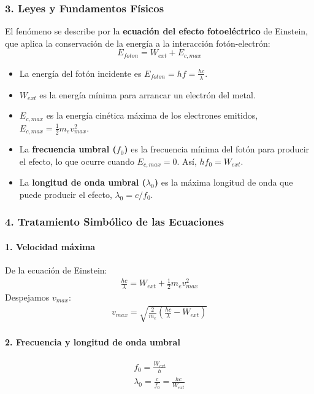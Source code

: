 \subsubsection*{3. Leyes y Fundamentos Físicos}
El fenómeno se describe por la \textbf{ecuación del efecto fotoeléctrico} de Einstein, que aplica la conservación de la energía a la interacción fotón-electrón:
$$ E_{foton} = W_{ext} + E_{c,max} $$
\begin{itemize}
    \item La energía del fotón incidente es $E_{foton} = hf = \frac{hc}{\lambda}$.
    \item $W_{ext}$ es la energía mínima para arrancar un electrón del metal.
    \item $E_{c,max}$ es la energía cinética máxima de los electrones emitidos, $E_{c,max} = \frac{1}{2}m_e v_{max}^2$.
    \item La \textbf{frecuencia umbral ($f_0$)} es la frecuencia mínima del fotón para producir el efecto, lo que ocurre cuando $E_{c,max}=0$. Así, $hf_0 = W_{ext}$.
    \item La \textbf{longitud de onda umbral ($\lambda_0$)} es la máxima longitud de onda que puede producir el efecto, $\lambda_0 = c/f_0$.
\end{itemize}

\subsubsection*{4. Tratamiento Simbólico de las Ecuaciones}
\paragraph*{1. Velocidad máxima}
De la ecuación de Einstein:
\begin{gather}
    \frac{hc}{\lambda} = W_{ext} + \frac{1}{2}m_e v_{max}^2
\end{gather}
Despejamos $v_{max}$:
\begin{gather}
    v_{max} = \sqrt{\frac{2}{m_e}\left(\frac{hc}{\lambda} - W_{ext}\right)}
\end{gather}

\paragraph*{2. Frecuencia y longitud de onda umbral}
\begin{gather}
    f_0 = \frac{W_{ext}}{h} \\
    \lambda_0 = \frac{c}{f_0} = \frac{hc}{W_{ext}}
\end{gather}

